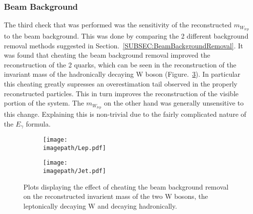 \subsubsection{Beam Background}
\label{SUBSUBSEC:BeamBackground}
The third check that was performed was the sensitivity of the reconstructed ${m}_{W_{lep}}$  to the beam background. This was done by comparing the 2 different background removal methods suggested in Section.~\ref{SUBSEC:BeamBackgroundRemoval}. It was found that cheating the beam background removal improved the reconstruction of the 2 quarks, which can be seen in the reconstruction of the invariant mass of the hadronically decaying W boson (Figure.~\ref{FIG:Cheat}). In particular this cheating greatly supresses an overestimation tail observed in the properly reconstructed particles. This in turn improves the reconstruction of the visible portion of the system. The ${m}_{W_{lep}}$ on the other hand was generally unsensitive to this change. Explaining this is non-trivial due to the fairly complicated nature of the $E_{\gamma}$ formula.
\begin{figure}
    \begin{subfigure}[t]{0.45\textwidth}
      \centering
      \texttt{[image: \\imagepath/Lep.pdf]}
      \caption{}
      \label{SUBFIG:CheatLep}
    \end{subfigure}
    \begin{subfigure}[t]{0.45\textwidth}
      \centering
      \texttt{[image: \\imagepath/Jet.pdf]}
      \caption{}
      \label{SUBFIG:CheatHad}
    \end{subfigure}
    \caption{
        Plots displaying the effect of cheating the beam background removal on the reconstructed invarient mass of the two W bosons,
         the leptonically decaying W and  decaying hadronically.
      }
    \label{FIG:Cheat}
\end{figure}

